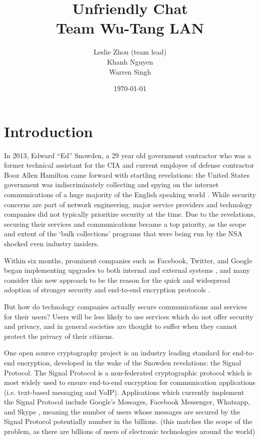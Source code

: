 \documentclass[12pt]{article}
\title{%
    Unfriendly Chat\\
    \large Team Wu-Tang LAN}
\author{Leslie Zhou (team lead)\\ Khanh Nguyen \\ Warren Singh}
\date{\today}
\begin{document}
\maketitle

\newpage
\tableofcontents
\newpage

\section{Introduction}
In 2013, Edward “Ed” Snowden, a 29 year old government contractor who was a former technical assistant for the CIA and current employee of defense contractor Booz Allen Hamilton came forward with startling revelations: the United States government was indiscriminately collecting and spying on the internet communications of a huge majority of the English speaking world \parencite{website:snowden}. While security concerns are part of network engineering, major service providers and technology companies did not typically prioritize security at the time. Due to the revelations, securing their services and communications became a top priority, as the scope and extent of the ‘bulk collections’ programs that were being run by the NSA shocked even industry insiders.
\par Within six months, prominent companies such as Facebook, Twitter, and Google began implementing upgrades to both internal and external systems \parencite{website:nytimes}, and many consider this new approach to be the reason for the quick and widespread adoption of stronger security and end-to-end encryption protocols \parencite{website:newsweek}. 

\par %
But how do technology companies actually secure communications and services for their users? Users will be less likely to use services which do not offer security and privacy, and in general societies are thought to suffer when they cannot protect the privacy of their citizens. 
\par One open source cryptography project \parencite{website:open-source} is an industry leading standard \parencite{website:signal-widespread} for end-to-end encryption, developed in the wake of the Snowden revelations: the Signal Protocol. The Signal Protocol \parencite{website:signal-docs} is a non-federated cryptographic protocol which is most widely used to ensure end-to-end encryption for communication applications (i.e. text-based messaging and VoIP). Applications which currently implement the Signal Protocol include Google’s Messages, Facebook Messenger, Whatsapp, and Skype \parencite{website:signal-widespread}, meaning the number of users whose messages are secured by the Signal Protocol potentially number in the billions. (this matches the scope of the problem, as there are billions of users of electronic technologies around the world)
\end{document}
